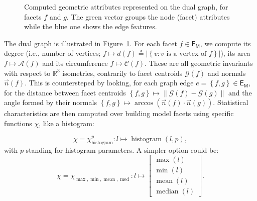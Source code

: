         \begin{figure}[htbp]
            \centering
            
            \caption[
                Computed geometric attributes represented on the dual graph, for facets \(f\) and \(g\).
            ]{
                \label{fig::geometric_baseline_features}
                Computed geometric attributes represented on the dual graph, for facets \(f\) and \(g\).
                The green vector groups the node (facet) attributes while the blue one shows the edge features.
            }
        \end{figure}

        The dual graph is illustrated in Figure~\ref{fig::geometric_baseline_features}.
        For each facet $f \in \mathsf{F_M}$, we compute its degree (i.e., number of vertices; $f \mapsto d\left(f\right) \triangleq \left\lvert\left\{v : v\text{ is a vertex of }f\right\}\right\rvert$), its area $f \mapsto \mathscr{A}\left(f\right)$ and its circumference $f \mapsto \mathscr{C}\left(f\right)$.
        These are all geometric invariants with respect to $\mathbb{R}^3$ isometries, contrarily to facet centroids $\mathscr{G}\left(f\right)$ and normals $\vec{n}\left(f\right)$.
        This is countersteped by looking, for each graph edge $e=\left\{f, g\right\} \in \mathsf{E_M}$, for the distance between facet centroids $\left\{f, g\right\} \mapsto \left\lVert \mathscr{G}\left(f\right) - \mathscr{G}\left(g\right) \right\rVert$ and the angle formed by their normals $\left\{f, g\right\} \mapsto \arccos\left(\vec{n}\left(f\right) \cdot \vec{n}\left(g\right)\right)$.
        Statistical characteristics are then computed over building model facets using specific functions \(\chi\), like a histogram:        

        \begin{equation}
            \label{eq::histogram_extractor}
        	\chi = \chi^p_{\operatorname{histogram}}: l \mapsto \operatorname{histogram}(l, p),
        \end{equation}
        with $p$ standing for histogram parameters. A simpler option could be:
        \begin{equation}
            \label{eq::max_min_mean_med_extractor}
            \chi = \chi_{\max,\min,\operatorname{mean},\operatorname{med}}: l \mapsto \begin{bmatrix}
                \max(l)\\
                \min(l)\\
                \operatorname{mean}(l)\\
                \operatorname{median}(l)
            \end{bmatrix}.
        \end{equation}

